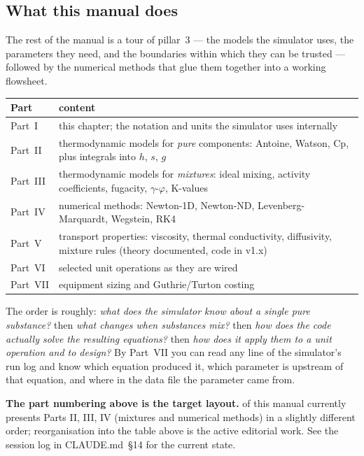 \documentclass[11pt,a4paper]{article}
\begin{document}
\subsection{What this manual does}

The rest of the manual is a tour of pillar~3 --- the models the
simulator uses, the parameters they need, and the boundaries within
which they can be trusted --- followed by the numerical methods that
glue them together into a working flowsheet.

\begin{center}\small
\begin{tabular}{@{}ll@{}}
\toprule
Part        & content \\
\midrule
Part~I      & this chapter; the notation and units the simulator uses internally\\
Part~II     & thermodynamic models for \emph{pure} components: Antoine, Watson, Cp, plus integrals into $h$, $s$, $g$ \\
Part~III    & thermodynamic models for \emph{mixtures}: ideal mixing, activity coefficients, fugacity, $\gamma$-$\varphi$, K-values \\
Part~IV     & numerical methods: Newton-1D, Newton-ND, Levenberg-Marquardt, Wegstein, RK4 \\
Part~V      & transport properties: viscosity, thermal conductivity, diffusivity, mixture rules (theory documented, code in v1.x) \\
Part~VI     & selected unit operations as they are wired  \\
Part~VII    & equipment sizing and Guthrie/Turton costing \\
\bottomrule
\end{tabular}
\end{center}

\noindent
The order is roughly: \emph{what does the simulator know about a
single pure substance?} then \emph{what changes when substances
mix?} then \emph{how does the code actually solve the resulting
equations?} then \emph{how does it apply them to a unit operation
and to design?}  By Part~VII you can read any line of the
simulator's run log and know which equation produced it, which
parameter is upstream of that equation, and where in the data file
the parameter came from.

\begin{tutoriallink}
\textbf{The part numbering above is the target layout.} of
this manual currently presents Parts II, III, IV (mixtures and
numerical methods) in a slightly different order; reorganisation
into the table above is the active editorial work.  See the session
log in CLAUDE.md~§14 for the current state.
\end{tutoriallink}
\end{document}
